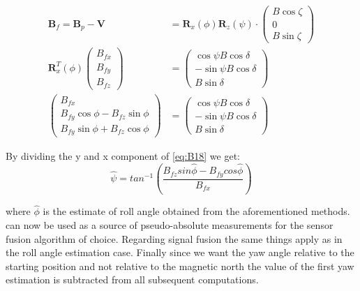 \begin{align}
    \boldsymbol{B}_f = \boldsymbol{B}_p-\boldsymbol{V} &= \boldsymbol{R}_x(\phi)\boldsymbol{R}_z(\psi)\cdot \left(\begin{array}{c}{B\cos \zeta} \\ {0} \\ {B\sin \zeta}\end{array}\right)  \\
    \boldsymbol{R}^T_x(\phi)\left(\begin{array}{c}{B_{fx}} \\ {B_{fy}} \\ {B_{fz}}\end{array}\right)   &= \left(\begin{array}{c}{\cos \psi B \cos \delta} \\ {-\sin \psi B \cos \delta} \\ {B \sin \delta}\end{array}\right) \\
    \left(\begin{array}{c}{B_{f x} } \\ {B_{f y} \cos \phi-B_{f z} \sin \phi} \\ {B_{f y} \sin \phi+ B_{f z}  \cos \phi}\end{array}\right) &= \left(\begin{array}{c}{\cos \psi B \cos \delta} \\ {-\sin \psi B \cos \delta} \\ {B \sin \delta}\end{array}\right) \label{eq:B18}
\end{align}

By dividing the y and x component of  \cref{eq:B18} we get:
\begin{equation}
    \hat{\psi}=tan^{-1}\left(\frac{B_{f z}sin\hat{\phi}-B_{f y}cos\hat{\phi}}{B_{f x}}\right)
    \label{eq:psiMag}
\end{equation} 

where \ensuremath{\hat{\phi}} is the estimate of roll angle obtained from the aforementioned methods.  can now be used as a source of pseudo-absolute measurements for the sensor fusion algorithm of choice. Regarding signal fusion the same things apply as in the roll angle estimation case. Finally since we want the yaw angle relative to the starting position and not relative to the magnetic north the value of the first yaw estimation is subtracted from all subsequent computations.